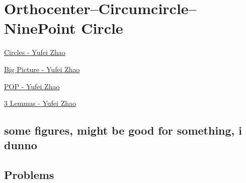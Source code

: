 \graphicspath{{Pics/}}


\newpage\section{Orthocenter--Circumcircle--NinePoint Circle}


\begin{myitemize}
\item \href{http://yufeizhao.com/olympiad/imo2008/zhao-circles.pdf}{Circles - Yufei Zhao}
\item \href{http://yufeizhao.com/olympiad/cyclic_quad.pdf}{Big Picture - Yufei Zhao}
\item \href{http://yufeizhao.com/olympiad/power_of_a_point.pdf}{POP - Yufei Zhao}
\item \href{http://yufeizhao.com/olympiad/three_geometry_lemmas.pdf}{3 Lemmas - Yufei Zhao}
\end{myitemize}


\subsection{some figures, might be good for something, i dunno}




\subsection{Problems}


\begin{minipage}{.3\textwidth}
\end{minipage}\hfill%
\begin{minipage}{.65\textwidth}
\end{minipage}








